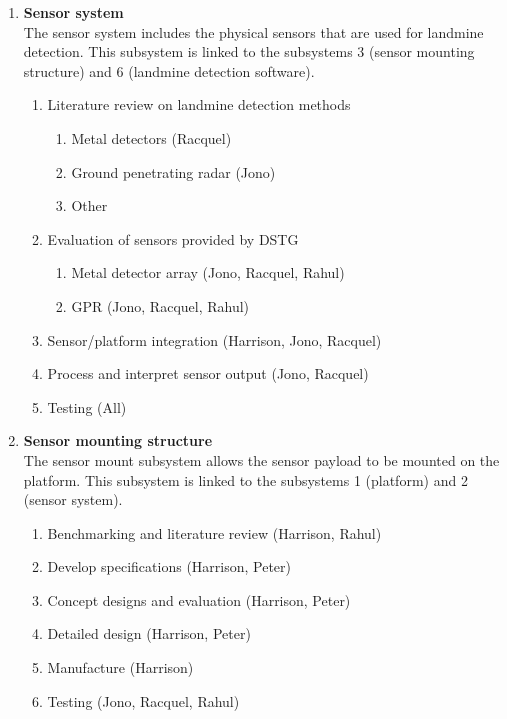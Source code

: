 \documentclass[main.tex]{subfiles}
\begin{document}
\begin{appendices}
{\begin{enumerate}
\item \textbf{Sensor system}\\
The sensor system includes the physical sensors that are used for landmine detection. This subsystem is linked to the subsystems 3 (sensor mounting structure) and 6 (landmine detection software).  
	\begin{enumerate}[label*=\arabic*.]
	\item Literature review on landmine detection methods
    	\begin{enumerate}[label*=\arabic*.]
        \item Metal detectors (Racquel)
        \item Ground penetrating radar (Jono)
        \item Other
		\end{enumerate}
    \item Evaluation of sensors provided by DSTG
	    \begin{enumerate}[label*=\arabic*.]
		\item Metal detector array (Jono, Racquel, Rahul)
        \item GPR (Jono, Racquel, Rahul)
        \end{enumerate}
    \item Sensor/platform integration (Harrison, Jono, Racquel)
    \item Process and interpret sensor output (Jono, Racquel)
    \item Testing (All)
    \end{enumerate}
    
\item \textbf{Sensor mounting structure}\\
The sensor mount subsystem allows the sensor payload to be mounted on the platform. This subsystem is linked to the subsystems 1 (platform) and 2 (sensor system).
	\begin{enumerate}[label*=\arabic*.]
	\item Benchmarking and literature review (Harrison, Rahul)
    \item Develop specifications (Harrison, Peter)
    \item Concept designs and evaluation (Harrison, Peter)
    \item Detailed design (Harrison, Peter)
    \item Manufacture (Harrison)
    \item Testing (Jono, Racquel, Rahul)
    \end{enumerate}
    

\end{enumerate}}
\end{appendices}
\end{document}
